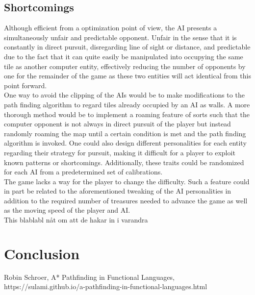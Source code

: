 \documentclass{article}
\begin{document}
\subsection{Shortcomings}
Although efficient from a optimization point of view, the AI presents a simultaneously unfair and predictable opponent. Unfair in the sense that it is constantly in direct pursuit, disregarding line of sight or distance, and predictable due to the fact that it can quite easily be manipulated into occupying the same tile as another computer entity, effectively reducing the number of opponents by one for the remainder of the game as these two entities will act identical from this point forward.\\
\newline
One way to avoid the clipping of the AIs would be to make modifications to the path finding algorithm to regard tiles already occupied by an AI as walls. A more thorough method would be to implement a roaming feature of sorts such that the computer opponent is not always in direct pursuit of the player but instead randomly roaming the map until a certain condition is met and the path finding algorithm is invoked. One could also design different personalities for each entity regarding their strategy for pursuit, making it difficult for a player to exploit known patterns or shortcomings. Additionally, these traits could be randomized for each AI from a predetermined set of calibrations.\\
\newline
The game lacks a way for the player to change the difficulty. Such a feature could in part be related to the aforementioned tweaking of the AI personalities in addition to the required number of treasures needed to advance the game as well as the moving speed of the player and AI.\\
\newline
This blablabl nåt om att de hakar in i varandra
\section{Conclusion}


\begin{thebibliography}{9}

  Robin Schroer,
  A* Pathfinding in Functional Languages,
  https://sulami.github.io/a-pathfinding-in-functional-languages.html

\end{thebibliography}
\end{document}
